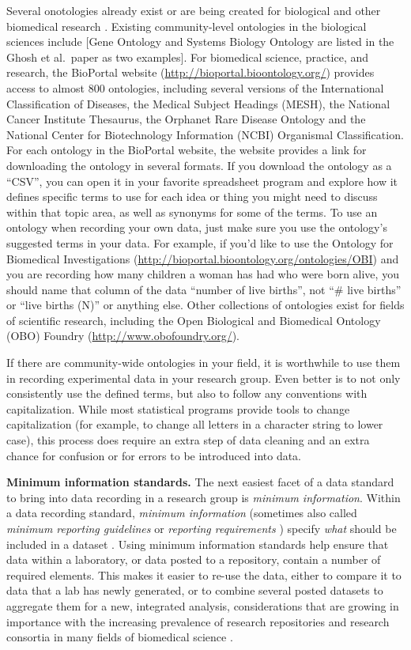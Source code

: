 \documentclass[]{tufte-book}
\begin{document}
Several onotologies already exist or are being created for biological and other
biomedical research \citep{ghosh2011software}. Existing community-level ontologies in
the biological sciences include {[}Gene Ontology and Systems Biology Ontology are
listed in the Ghosh et al.~paper as two examples{]}. For biomedical science,
practice, and research, the BioPortal website
(\url{http://bioportal.bioontology.org/}) provides access to almost 800 ontologies,
including several versions of the International Classification of Diseases, the
Medical Subject Headings (MESH), the National Cancer Institute Thesaurus, the
Orphanet Rare Disease Ontology and the National Center for Biotechnology
Information (NCBI) Organismal Classification. For each ontology in the BioPortal
website, the website provides a link for downloading the ontology in several
formats. If you download the ontology as a ``CSV'', you can open it in your
favorite spreadsheet program and explore how it defines specific terms to use
for each idea or thing you might need to discuss within that topic area, as well
as synonyms for some of the terms. To use an ontology when recording your own
data, just make sure you use the ontology's suggested terms in your data. For
example, if you'd like to use the Ontology for Biomedical Investigations
(\url{http://bioportal.bioontology.org/ontologies/OBI}) and you are recording how many
children a woman has had who were born alive, you should name that column of the
data ``number of live births'', not ``\# live births'' or ``live births (N)'' or
anything else. Other collections of ontologies exist for fields of scientific
research, including the Open Biological and Biomedical Ontology (OBO) Foundry
(\url{http://www.obofoundry.org/}).

If there are community-wide ontologies in your field, it is worthwhile to use
them in recording experimental data in your research group. Even better is to
not only consistently use the defined terms, but also to follow any conventions
with capitalization. While most statistical programs provide tools to change
capitalization (for example, to change all letters in a character string to
lower case), this process does require an extra step of data cleaning and an
extra chance for confusion or for errors to be introduced into data.

\textbf{Minimum information standards.} The next easiest facet of a data standard to
bring into data recording in a research group is \emph{minimum information}. Within a
data recording standard, \emph{minimum information} (sometimes also called \emph{minimum
reporting guidelines} \citep{sansone2012toward} or \emph{reporting requirements}
\citep{brazma2006standards}) specify \emph{what} should be included in a dataset
\citep{ghosh2011software}. Using minimum information standards help ensure that data
within a laboratory, or data posted to a repository, contain a number of
required elements. This makes it easier to re-use the data, either to compare it
to data that a lab has newly generated, or to combine several posted datasets to
aggregate them for a new, integrated analysis, considerations that are growing
in importance with the increasing prevalence of research repositories and
research consortia in many fields of biomedical science \citep{keller2017evolution}.
\end{document}
